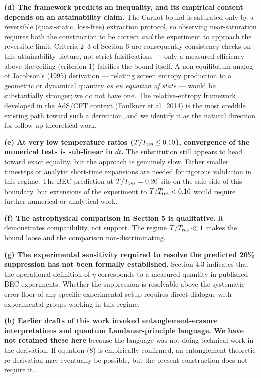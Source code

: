 \documentclass[11pt]{article}
\begin{document}
\textbf{(d) The framework predicts an inequality, and its empirical content depends on an attainability claim.} The Carnot bound is saturated only by a reversible (quasi-static, loss-free) extraction protocol, so observing near-saturation requires both the construction to be correct \emph{and} the experiment to approach the reversible limit. Criteria 2--3 of Section 6 are consequently consistency checks on this attainability picture, not strict falsifications --- only a measured efficiency above the ceiling (criterion 1) falsifies the bound itself. A non-equilibrium analog of Jacobson's (1995) derivation --- relating screen entropy production to a geometric or dynamical quantity \emph{as an equation of state} --- would be substantially stronger; we do not have one. The relative-entropy framework developed in the AdS/CFT context (Faulkner et al.~2014) is the most credible existing path toward such a derivation, and we identify it as the natural direction for follow-up theoretical work.

\textbf{(e) At very low temperature ratios (\(T/T_{\rm res} \leq 0.10\)), convergence of the numerical tests is sub-linear in \(dt\).} The substitution still appears to head toward exact equality, but the approach is genuinely slow. Either smaller timesteps or analytic short-time expansions are needed for rigorous validation in this regime. The BEC prediction at \(T/T_{\rm res} = 0.20\) sits on the safe side of this boundary, but extensions of the experiment to \(T/T_{\rm res} < 0.10\) would require further numerical or analytical work.

\textbf{(f) The astrophysical comparison in Section 5 is qualitative.} It demonstrates compatibility, not support. The regime \(T/T_{\rm res} \ll 1\) makes the bound loose and the comparison non-discriminating.

\textbf{(g) The experimental sensitivity required to resolve the predicted 20\% suppression has not been formally established.} Section 4.3 indicates that the operational definition of \(\eta\) corresponds to a measured quantity in published BEC experiments. Whether the suppression is resolvable above the systematic error floor of any specific experimental setup requires direct dialogue with experimental groups working in this regime.

\textbf{(h) Earlier drafts of this work invoked entanglement-erasure interpretations and quantum Landauer-principle language. We have not retained these here} because the language was not doing technical work in the derivation. If equation (8) is empirically confirmed, an entanglement-theoretic re-derivation may eventually be possible, but the present construction does not require it.
\end{document}
